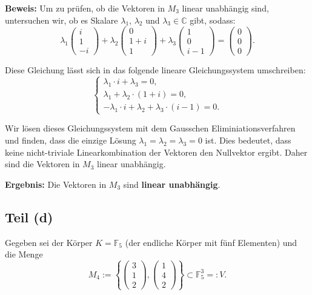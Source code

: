 \documentclass[11pt]{article}
\begin{document}
\textbf{Beweis:} Um zu prüfen, ob die Vektoren in \( M_3 \) linear unabhängig sind, untersuchen wir, ob es Skalare \( \lambda_1 \), \( \lambda_2 \) und \( \lambda_3 \in \mathbb{C} \) gibt, sodass:
\[
\lambda_1 \begin{pmatrix} i \\ 1 \\ -i \end{pmatrix} + \lambda_2 \begin{pmatrix} 0 \\ 1 + i \\ 1 \end{pmatrix} + \lambda_3 \begin{pmatrix} 1 \\ 0 \\ i - 1 \end{pmatrix} = \begin{pmatrix} 0 \\ 0 \\ 0 \end{pmatrix}.
\]

Diese Gleichung lässt sich in das folgende lineare Gleichungssystem umschreiben:
\[
\begin{cases}
\lambda_1 \cdot i + \lambda_3 = 0, \\
\lambda_1 + \lambda_2 \cdot (1 + i) = 0, \\
-\lambda_1 \cdot i + \lambda_2 + \lambda_3 \cdot (i - 1) = 0.
\end{cases}
\]

Wir lösen dieses Gleichungssystem mit dem Gausschen Eliminiationsverfahren und finden, dass die einzige Lösung \( \lambda_1 = \lambda_2 = \lambda_3 = 0 \) ist. Dies bedeutet, dass keine nicht-triviale Linearkombination der Vektoren den Nullvektor ergibt. Daher sind die Vektoren in \( M_3 \) linear unabhängig.

\textbf{Ergebnis:} Die Vektoren in \( M_3 \) sind \textbf{linear unabhängig}.

\subsection*{Teil (d)}

Gegeben sei der Körper \( K = \mathbb{F}_5 \) (der endliche Körper mit fünf Elementen) und die Menge
\[
M_4 := \left\{ \begin{pmatrix} 3 \\ 1 \\ 2 \end{pmatrix}, \begin{pmatrix} 1 \\ 4 \\ 2 \end{pmatrix} \right\} \subset \mathbb{F}_5^3 =: V.
\]
\end{document}
